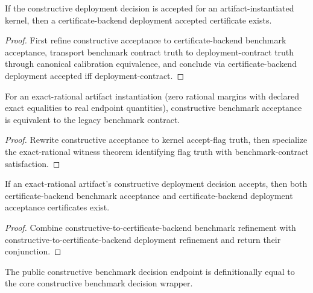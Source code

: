 \begin{theorem}
\label{thm:definitive-constructive-deployment-refines-certificate-backend-deployment}
If the constructive deployment decision is accepted for an artifact-instantiated kernel, then a certificate-backend deployment accepted certificate exists.
\end{theorem}

\begin{proof}
First refine constructive acceptance to certificate-backend benchmark acceptance, transport benchmark contract truth to deployment-contract truth through canonical calibration equivalence, and conclude via certificate-backend deployment accepted iff deployment-contract.
\end{proof}

\begin{theorem}
\label{thm:definitive-exact-rat-artifact-accept-iff-benchmark-contract}
For an exact-rational artifact instantiation (zero rational margins with declared exact equalities to real endpoint quantities), constructive benchmark acceptance is equivalent to the legacy benchmark contract.
\end{theorem}

\begin{proof}
Rewrite constructive acceptance to kernel accept-flag truth, then specialize the exact-rational witness theorem identifying flag truth with benchmark-contract satisfaction.
\end{proof}

\begin{theorem}
\label{thm:definitive-exact-rat-artifact-accept-refines-certificate-backend-accepts}
If an exact-rational artifact's constructive deployment decision accepts, then both certificate-backend benchmark acceptance and certificate-backend deployment acceptance certificates exist.
\end{theorem}

\begin{proof}
Combine constructive-to-certificate-backend benchmark refinement with constructive-to-certificate-backend deployment refinement and return their conjunction.
\end{proof}

\begin{theorem}
\label{thm:definitive-benchmark-decision-alias-exactness}
The public constructive benchmark decision endpoint is definitionally equal to the core constructive benchmark decision wrapper.
\end{theorem}

